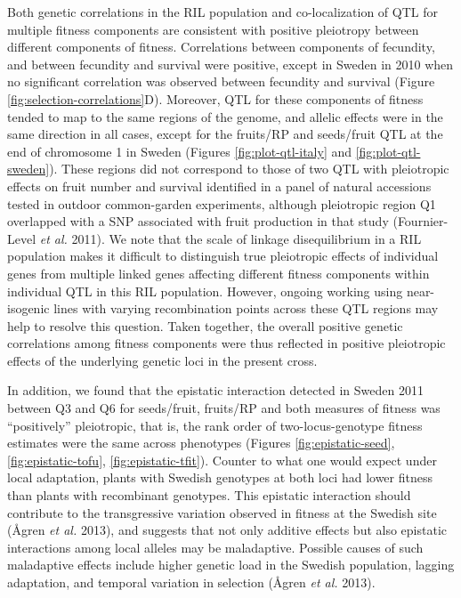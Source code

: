 \documentclass[
]{article}
\begin{document}
Both genetic correlations in the RIL population and co-localization of QTL for multiple fitness components are consistent with positive pleiotropy between different components of fitness. Correlations between components of fecundity, and between fecundity and survival were positive, except in Sweden in 2010 when no significant correlation was observed between fecundity and survival (Figure \ref{fig:selection-correlations}D). Moreover, QTL for these components of fitness tended to map to the same regions of the genome, and allelic effects were in the same direction in all cases, except for the fruits/RP and seeds/fruit QTL at the end of chromosome 1 in Sweden (Figures \ref{fig:plot-qtl-italy} and \ref{fig:plot-qtl-sweden}). These regions did not correspond to those of two QTL with pleiotropic effects on fruit number and survival identified in a panel of natural accessions tested in outdoor common-garden experiments, although pleiotropic region Q1 overlapped with a SNP associated with fruit production in that study (Fournier-Level \emph{et al.} 2011). We note that the scale of linkage disequilibrium in a RIL population makes it difficult to distinguish true pleiotropic effects of individual genes from multiple linked genes affecting different fitness components within individual QTL in this RIL population. However, ongoing working using near-isogenic lines with varying recombination points across these QTL regions may help to resolve this question.
Taken together, the overall positive genetic correlations among fitness components were thus reflected in positive pleiotropic effects of the underlying genetic loci in the present cross.

In addition, we found that the epistatic interaction detected in Sweden 2011 between Q3 and Q6 for seeds/fruit, fruits/RP and both measures of fitness was ``positively'' pleiotropic, that is, the rank order of two-locus-genotype fitness estimates were the same across phenotypes (Figures \ref{fig:epistatic-seed}, \ref{fig:epistatic-tofu}, \ref{fig:epistatic-tfit}). Counter to what one would expect under local adaptation, plants with Swedish genotypes at both loci had lower fitness than plants with recombinant genotypes. This epistatic interaction should contribute to the transgressive variation observed in fitness at the Swedish site (Ågren \emph{et al.} 2013), and suggests that not only additive effects but also epistatic interactions among local alleles may be maladaptive. Possible causes of such maladaptive effects include higher genetic load in the Swedish population, lagging adaptation, and temporal variation in selection (Ågren \emph{et al.} 2013).
\end{document}
